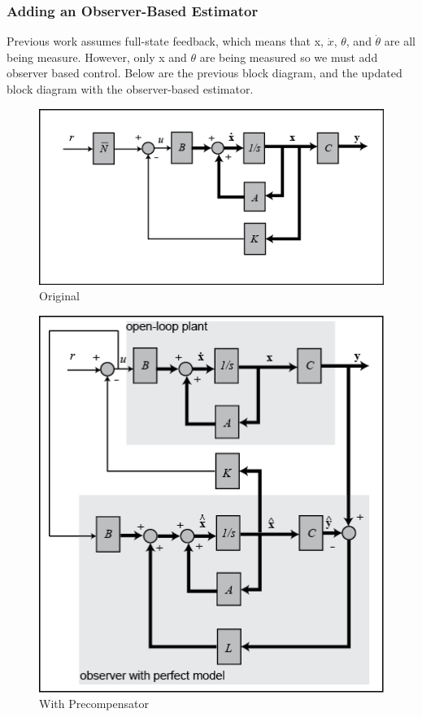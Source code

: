 \documentclass{article}
\begin{document}
 \subsubsection{Adding an Observer-Based Estimator}
 Previous work assumes full-state feedback, which means that x, $\dot{x}$, $\theta$, and $\dot{\theta}$ are all being measure. However, only x and $\theta$ are being measured so we must add observer based control. Below are the previous block diagram, and the updated block diagram with the observer-based estimator.

\begin{figure}[!htb]
\centering
  \includegraphics[width=.7\linewidth]{blockd}
  \caption{Original}
  \label{bd}
  \end{figure}

\begin{figure}[!htb]
\centering
  \includegraphics[width=.6\linewidth]{observer_blockd}
  \caption{With Precompensator}
  \label{bd2}
\end{figure}


\clearpage
\end{document}
